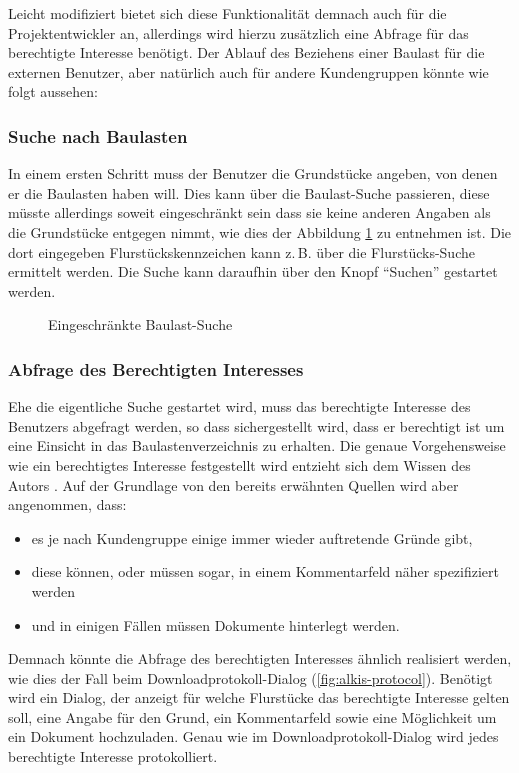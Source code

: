 Leicht modifiziert bietet sich diese Funktionalität demnach auch für die Projektentwickler an, allerdings wird hierzu zusätzlich eine Abfrage für das berechtigte Interesse benötigt.
Der Ablauf des Beziehens einer Baulast für die externen Benutzer, aber natürlich auch für andere Kundengruppen könnte wie folgt aussehen:
\subsubsection{Suche nach Baulasten}
In einem ersten Schritt muss der Benutzer die Grundstücke angeben, von denen er die Baulasten haben will.
Dies kann über die Baulast-Suche passieren, diese müsste allerdings soweit eingeschränkt sein dass sie keine anderen Angaben als die Grundstücke entgegen nimmt, wie dies der Abbildung \ref{fig:baulast-suche} zu entnehmen ist.
Die dort eingegeben Flurstückskennzeichen kann z.\,B. über die Flurstücks-Suche ermittelt werden. Die Suche kann daraufhin über den Knopf \enquote{Suchen} gestartet werden.

\begin{figure}[htbp]
	\centering
	\caption{Eingeschränkte Baulast-Suche}
	\label{fig:baulast-suche}
\end{figure}

\subsubsection{Abfrage des Berechtigten Interesses}
Ehe die eigentliche Suche gestartet wird, muss das berechtigte Interesse des Benutzers abgefragt werden, so dass sichergestellt wird, dass er berechtigt ist um eine Einsicht in das Baulastenverzeichnis zu erhalten.
Die genaue Vorgehensweise wie ein berechtigtes Interesse festgestellt wird entzieht sich dem Wissen des Autors .
Auf der Grundlage von den bereits erwähnten Quellen wird aber angenommen, dass:
\begin{itemize}
\item es je nach Kundengruppe einige immer wieder auftretende Gründe gibt,
\item diese können, oder müssen sogar, in einem Kommentarfeld näher spezifiziert werden
\item und in einigen Fällen müssen Dokumente hinterlegt werden.
\end{itemize}
Demnach könnte die Abfrage des berechtigten Interesses ähnlich realisiert werden, wie dies der Fall beim Downloadprotokoll-Dialog (\autoref{fig:alkis-protocol}).
Benötigt wird ein Dialog, der anzeigt für welche Flurstücke das berechtigte Interesse gelten soll, eine Angabe für den Grund, ein Kommentarfeld sowie eine Möglichkeit um ein Dokument hochzuladen.
Genau wie im Downloadprotokoll-Dialog wird jedes berechtigte Interesse protokolliert.

